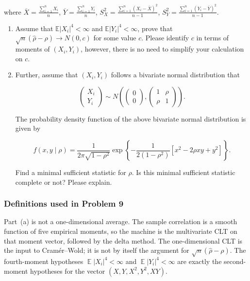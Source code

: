 \documentclass[11pt,a4paper]{article}
\DeclareMathOperator{\E}{\mathbb{E}}
\begin{document}
where \( \overline{X} = \frac{\sum_{i=1}^n X_i}{n} \), \( \overline{Y} = \frac{\sum_{i=1}^n Y_i}{n} \), \( S_X^2 = \frac{\sum_{i=1}^n (X_i - \overline{X})^2}{n-1} \), \( S_Y^2 = \frac{\sum_{i=1}^n (Y_i - \overline{Y})^2}{n-1} \).
\begin{enumerate}[label=(\alph*)]
    \item Assume that \( \mathbb{E}|X_i|^4 < \infty \) and \( \mathbb{E}|Y_i|^4 < \infty \), prove that \( \sqrt{n}(\hat{\rho} - \rho) \longrightarrow N(0, c) \) for some value \( c \). Please identify \( c \) in terms of moments of \( (X_i, Y_i) \), however, there is no need to simplify your calculation on \( c \).
    \item Further, assume that \( (X_i, Y_i) \) follows a bivariate normal distribution that

    \[
    \begin{pmatrix} X_i \\ Y_i \end{pmatrix}
    \sim
    N\left(
    \begin{pmatrix} 0 \\ 0 \end{pmatrix},
    \begin{pmatrix} 1 & \rho \\ \rho & 1 \end{pmatrix}
    \right).
    \]

    The probability density function of the above bivariate normal distribution is given by

    \[
    f(x, y \mid \rho) = \frac{1}{2\pi \sqrt{1 - \rho^2}} \exp\left\{ -\frac{1}{2(1 - \rho^2)} [x^2 - 2\rho xy + y^2] \right\}.
    \]

    Find a minimal sufficient statistic for \( \rho \). Is this minimal sufficient statistic complete or not? Please explain.
\end{enumerate}

\setcounter{section}{9}

\subsubsection{Definitions used in Problem 9}

Part~(a) is not a one-dimensional average. The sample correlation is a smooth function of five empirical moments, so the machine is the multivariate CLT on that moment vector, followed by the delta method. The one-dimensional CLT is the input to Cramér--Wold; it is not by itself the argument for \( \sqrt{n}(\hat{\rho}-\rho) \). The fourth-moment hypotheses \( \E|X_i|^{4}<\infty \) and \( \E|Y_i|^{4}<\infty \) are exactly the second-moment hypotheses for the vector \( (X,Y,X^{2},Y^{2},XY) \).
\end{document}
